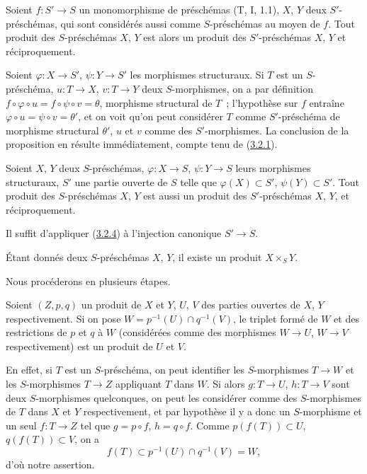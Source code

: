 \begin{proposition}[3.2.4]
\label{I.3.2.4-fr}
Soient $f:S'\to S$ un monomorphisme de préschémas (T, I, 1.1), $X$, $Y$ deux
$S'$-préschémas, qui sont considérés aussi comme $S$-préschémas au moyen de
$f$. Tout produit des $S$-préschémas $X$, $Y$ est alors un produit des
$S'$-préschémas $X$, $Y$ et réciproquement.
\end{proposition}

Soient $\varphi:X\to S'$, $\psi:Y\to S'$ les morphismes structuraux. Si $T$
est un $S$-préschéma, $u:T\to X$, $v:T\to Y$ deux $S$-morphismes, on a par
définition $f\circ\varphi\circ u=f\circ\psi\circ v=\theta$, morphisme
structural de $T$~; l'hypothèse sur $f$ entraîne
$\varphi\circ u=\psi\circ v=\theta'$, et on voit qu'on peut considérer $T$
comme $S'$-préschéma de morphisme structural $\theta'$, $u$ et $v$ comme des
$S'$-morphismes. La conclusion de la proposition en résulte immédiatement,
compte tenu de (\hyperref[I.3.2.1-fr]{3.2.1}).

\begin{corollary}[3.2.5]
\label{I.3.2.5-fr}
Soient $X$, $Y$ deux $S$-préschémas, $\varphi:X\to S$, $\psi:Y\to S$ leurs
morphismes structuraux, $S'$ une partie ouverte de $S$ telle que
$\varphi(X)\subset S'$, $\psi(Y)\subset S'$. Tout produit des $S$-préschémas
$X$, $Y$ est aussi un produit des $S'$-préschémas $X$, $Y$, et réciproquement.
\end{corollary}

Il suffit d'appliquer (\hyperref[I.3.2.4-fr]{3.2.4}) à l'injection canonique
$S'\to S$.

\begin{theorem}[3.2.6]
\label{I.3.2.6-fr}
Étant donnés deux $S$-préschémas $X$, $Y$, il existe un produit
$X\times_S Y$.
\end{theorem}

Nous procéderons en plusieurs étapes.

\begin{lemma}[3.2.6.1]
\label{I.3.2.6.1-fr}
Soient $(Z,p,q)$ un produit de $X$ et $Y$, $U$, $V$ des parties ouvertes de
$X$, $Y$ respectivement. Si on pose
$W=p^{-1}(U)\cap q^{-1}(V)$, le triplet formé de $W$ et des restrictions de
$p$ et $q$ à $W$ \textup{(considérées comme des morphismes $W\to U$,
$W\to V$ respectivement)} est un produit de $U$ et $V$.
\end{lemma}

En effet, si $T$ est un $S$-préschéma, on peut identifier les $S$-morphismes
$T\to W$ et les $S$-morphismes $T\to Z$ appliquant $T$ dans $W$. Si alors
$g:T\to U$, $h:T\to V$ sont deux $S$-morphismes quelconques, on peut les
considérer comme des $S$-morphismes de $T$ dans $X$ et $Y$ respectivement, et
par hypothèse il y a donc un $S$-morphisme et un seul $f:T\to Z$ tel que
$g=p\circ f$, $h=q\circ f$. Comme $p(f(T))\subset U$, $q(f(T))\subset V$,
on a
\[
  f(T)\subset p^{-1}(U)\cap q^{-1}(V)=W,
\]
d'où notre assertion.

